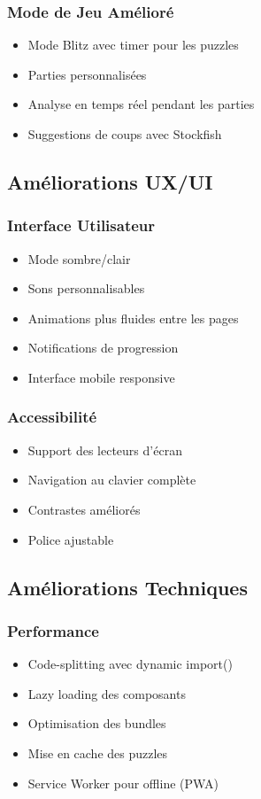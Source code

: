 \documentclass[a4paper,12pt]{article}
\begin{document}
\subsubsection{Mode de Jeu Amélioré}
\begin{itemize}
    \item Mode Blitz avec timer pour les puzzles
    \item Parties personnalisées
    \item Analyse en temps réel pendant les parties
    \item Suggestions de coups avec Stockfish
\end{itemize}

\subsection{Améliorations UX/UI}

\subsubsection{Interface Utilisateur}
\begin{itemize}
    \item Mode sombre/clair
    \item Sons personnalisables
    \item Animations plus fluides entre les pages
    \item Notifications de progression
    \item Interface mobile responsive
\end{itemize}

\subsubsection{Accessibilité}
\begin{itemize}
    \item Support des lecteurs d'écran
    \item Navigation au clavier complète
    \item Contrastes améliorés
    \item Police ajustable
\end{itemize}

\subsection{Améliorations Techniques}

\subsubsection{Performance}
\begin{itemize}
    \item Code-splitting avec dynamic import()
    \item Lazy loading des composants
    \item Optimisation des bundles
    \item Mise en cache des puzzles
    \item Service Worker pour offline (PWA)
\end{itemize}
\end{document}
